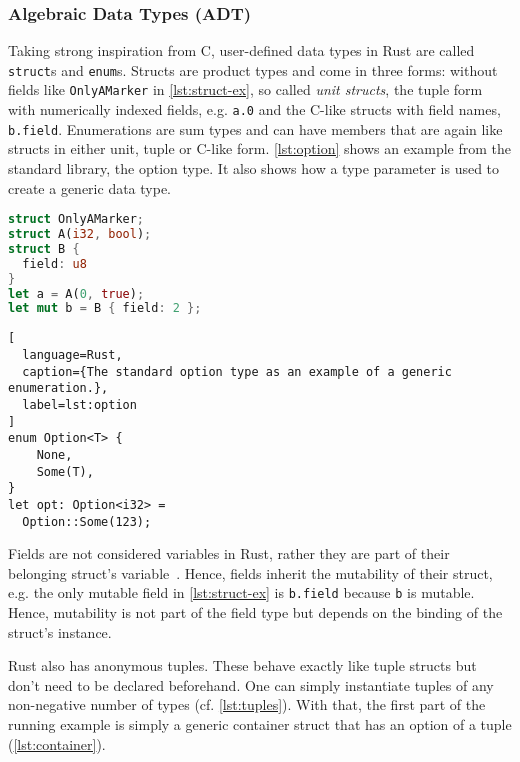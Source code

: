 \subsubsection{Algebraic Data Types (ADT)}

Taking strong inspiration from C, user-defined data types in Rust are called
\lstinline!struct!s and \lstinline!enum!s. Structs are product types and come in
three forms: without fields like \lstinline!OnlyAMarker! in
\autoref{lst:struct-ex}, so called \emph{unit structs}, the tuple form with
numerically indexed fields, e.g. \lstinline!a.0! and the C-like structs with
field names, \lstinline!b.field!. Enumerations are sum types and can have
members that are again like structs in either unit, tuple or C-like form.
\autoref{lst:option} shows  an example from the standard library, the option
type. It also shows how a type parameter is used to create a generic
data type.

\noindent\begin{minipage}[t]{.45\textwidth}
\begin{lstlisting}[language=Rust, caption={All three types of structs.}, label=lst:struct-ex]
struct OnlyAMarker;
struct A(i32, bool);
struct B {
  field: u8
}
let a = A(0, true);
let mut b = B { field: 2 };
\end{lstlisting}
\end{minipage}\hfill
\begin{minipage}[t]{.45\textwidth}
\begin{lstlisting}[
  language=Rust,
  caption={The standard option type as an example of a generic enumeration.},
  label=lst:option
]
enum Option<T> {
    None,
    Some(T),
}
let opt: Option<i32> =
  Option::Some(123);
\end{lstlisting}
\end{minipage}

Fields are not considered variables in Rust, rather they are part of their
belonging struct's variable~\cite{rustref}. Hence, fields inherit the mutability
of their struct, e.g. the only mutable field in \autoref{lst:struct-ex} is
\lstinline!b.field! because \lstinline!b! is mutable. Hence, mutability is not
part of the field type but depends on the binding of the struct's instance.

Rust also has anonymous tuples. These behave exactly like tuple structs but
don't need to be declared beforehand. One can simply instantiate tuples of any
non-negative number of types (cf. \autoref{lst:tuples}). With that, the first
part of the running example is simply a generic container struct that has an
option of a tuple (\autoref{lst:container}).

